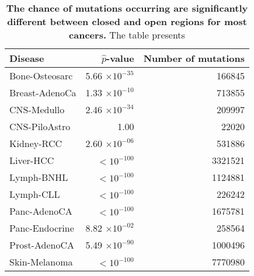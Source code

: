 \begin{table}[h]
\centering
\caption{\textbf{The chance of mutations occurring are significantly different between closed and open regions for most cancers.} The table presents }
\label{tab:g-test}
\begin{tabular}{lrr}
  \toprule
 \textbf{Disease} & \textbf{$\hat{p}$-value} & \textbf{Number of mutations} \\ 
  \hline
 Bone-Osteosarc & 5.66 $\times 10^{-35}$ & 166845 \\ 
 Breast-AdenoCa & 1.33 $\times 10^{-10}$ & 713855 \\ 
 CNS-Medullo & 2.46 $\times 10^{-34}$ & 209997 \\ 
 CNS-PiloAstro & 1.00 & 22020 \\ 
 Kidney-RCC & 2.60 $\times 10^{-06}$ & 531886 \\ 
 Liver-HCC & $<10^{-100}$ & 3321521 \\ 
 Lymph-BNHL & $<10^{-100}$ & 1124881 \\ 
 Lymph-CLL & $<10^{-100}$ & 226242 \\ 
 Panc-AdenoCA & $<10^{-100}$ & 1675781 \\ 
 Panc-Endocrine & 8.82 $\times 10^{-02}$ & 258564 \\ 
 Prost-AdenoCA & 5.49 $\times 10^{-90}$ & 1000496 \\ 
 Skin-Melanoma & $<10^{-100}$ & 7770980 \\ 
   \bottomrule
\end{tabular}
\end{table}